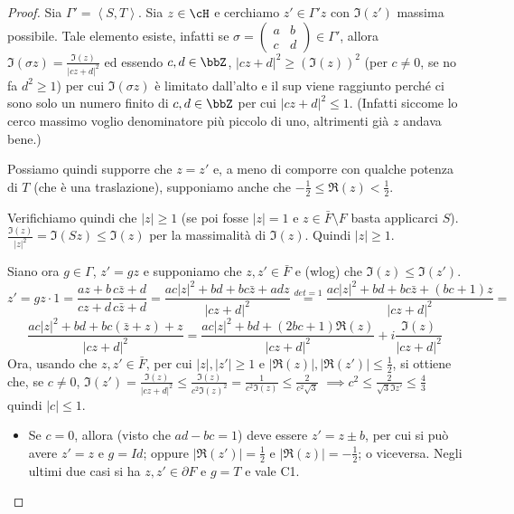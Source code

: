\begin{proof}
Sia $\Gamma'=\left\langle S,T \right\rangle$. Sia $z \in \cH$ e cerchiamo $z' \in \Gamma'z$ con $\Im(z')$ massima possibile. Tale elemento esiste, infatti se
$\sigma = \left( \begin{array}{cc} a & b \\ c & d \end{array} \right) \in \Gamma'$, allora $\Im(\sigma z) = \frac{\Im(z)}{|cz+d|^2}$ ed essendo
$c,d \in \bbZ$, $|cz+d|^2 \geq (\Im(z))^2$ (per $c \neq 0$, se no fa $d^2 \ge 1$) per cui $\Im(\sigma z)$ è limitato dall'alto e il sup viene raggiunto perché
ci sono solo un numero finito di $c,d \in \bbZ$ per cui $|cz+d|^2 \leq 1$. (Infatti siccome lo cerco massimo voglio denominatore più piccolo di uno,
altrimenti già $z$ andava bene.)


Possiamo quindi supporre che $z=z'$ e, a meno di comporre con qualche potenza
di $T$ (che è una traslazione), supponiamo anche che $-\frac{1}{2} \leq \Re(z) < \frac{1}{2}$.

Verifichiamo quindi che $|z| \geq 1$ (se poi fosse $|z|=1$ e
$z \in \bar{F} \setminus F$ basta applicarci $S$).
$\frac{\Im(z)}{|z|^2} = \Im(Sz) \leq \Im(z)$ per la massimalità di $\Im(z)$.
Quindi $|z| \geq 1$.
\vskip 0.5cm

Siano ora $g \in \Gamma$, $z'=gz$ e supponiamo che $z,z' \in \bar{F}$ e (wlog)
che $\Im(z) \leq \Im(z')$.
$$
z'= gz \cdot 1 = \frac{az+b}{cz+d} \frac{c \bar{z} +d}{c \bar{z} +d} =
\frac{ac|z|^2 + bd + bc \bar{z} + adz}{|cz+d|^2} \stackrel{det=1}{=}
\frac{ac|z|^2 + bd + bc \bar{z} + (bc+1)z}{|cz+d|^2} =
$$
$$
\frac{ac|z|^2 + bd + bc (\bar{z} + z) + z}{|cz+d|^2} =
\frac{ac|z|^2 + bd + (2bc+1) \Re(z)}{|cz+d|^2} + i \frac{\Im(z)}{|cz+d|^2}
$$
Ora, usando che $z,z' \in \bar{F}$, per cui $|z|,|z'| \geq 1$ e
$|\Re(z)|, |\Re(z')| \leq \frac{1}{2}$, si ottiene che, se $c \neq 0$,
$\Im(z') = \frac{\Im(z)}{|cz+d|^2} \leq \frac{\Im(z)}{c^2 \Im(z)^2}
= \frac{1}{c^2 \Im(z)} \leq \frac{2}{c^2 \sqrt{3}}$ $\implies c^2 \le \frac{2}{\sqrt{3}\Im z'} \le \frac{4}{3}$
quindi $|c| \leq 1$.

\begin{itemize}
\item Se $c=0$, allora (visto che $ad - bc = 1$) deve essere $z' = z \pm b$, per cui si può avere $z'=z$ e $g=Id$; oppure
  $|\Re(z')| = \frac{1}{2}$ e $|\Re(z)| = -\frac{1}{2}$; o viceversa.
  Negli ultimi due casi si ha $z,z' \in \partial F$ e $g=T$ e vale C1.


\end{itemize}
\end{proof}
